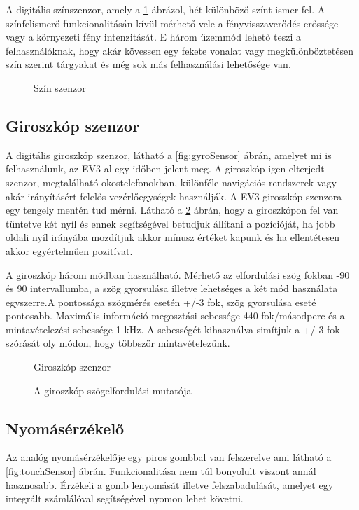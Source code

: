 A digitális színszenzor, amely a \ref{fig:colorSensor} ábrázol, hét különböző színt ismer fel. A színfelismerő funkcionalitásán kívül mérhető vele a fényvisszaverődés erőssége vagy a környezeti fény intenzitását. E három üzemmód lehető teszi a felhasználóknak, hogy akár kövessen egy fekete vonalat vagy megkülönböztetésen szín szerint tárgyakat és még sok más felhasználási lehetősége van.

\begin{figure}[!htb]
	\centering
	\caption{Szín szenzor}
	\label{fig:colorSensor}
\end{figure}

\subsection{Giroszkóp szenzor}

A digitális giroszkóp szenzor, látható a \ref{fig:gyroSensor} ábrán, amelyet mi is felhasználunk, az EV3-al egy időben jelent meg. A giroszkóp igen elterjedt szenzor, megtalálható okostelefonokban, különféle navigációs rendszerek vagy akár irányításért felelős vezérlőegységek használják. A EV3 giroszkóp szenzora egy tengely mentén tud mérni. Látható a \ref{fig:gyroFok} ábrán, hogy a giroszkópon fel van tüntetve két nyíl és ennek segítségével betudjuk állítani a pozícióját, ha jobb oldali nyíl irányába mozdítjuk akkor mínusz értéket kapunk és ha ellentétesen akkor egyértelműen pozitívat. 

A giroszkóp három módban használható. Mérhető az elfordulási szög fokban -90 és 90 intervallumba, a szög gyorsulása illetve lehetséges a két mód használata egyszerre.A pontossága szögmérés esetén +/-3 fok, szög gyorsulása eseté pontosabb. Maximális információ megosztási sebessége 440 fok/másodperc és a mintavételezési sebessége 1 kHz. A sebességét kihasználva simítjuk  a +/-3 fok szórását oly módon, hogy többször mintavételezünk.

\begin{figure}[!htb]
	\centering
	\caption{Giroszkóp szenzor}
	\label{fig:gyroSensor}
	\endminipage
	\caption{A giroszkóp szögelfordulási mutatója}
	\label{fig:gyroFok}
	\endminipage
\end{figure}

\subsection{Nyomásérzékelő}
Az analóg nyomásérzékelője egy piros gombbal van felszerelve ami látható a \ref{fig:touchSensor} ábrán. Funkcionalitása nem túl bonyolult viszont annál hasznosabb. Érzékeli a gomb lenyomását illetve felszabadulását, amelyet egy integrált számlálóval segítségével nyomon lehet követni. 

